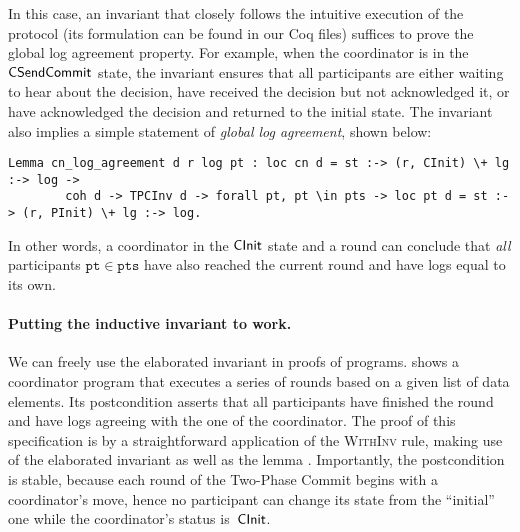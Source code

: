 
In this case, an invariant that closely follows the intuitive
execution of the protocol (its formulation can be found in our Coq
files) suffices to prove the global log agreement property.
%
For example, when the coordinator is in the $\mathsf{CSendCommit}$ state, the
invariant ensures that all participants are either waiting to hear
about the decision, have received the decision but not acknowledged
it, or have acknowledged the decision and returned to the initial state.
%
The invariant also implies a simple statement of \emph{global log agreement},
shown below:
%
\begin{lstlisting}[basicstyle=\footnotesize\ttfamily]
Lemma cn_log_agreement d r log pt : loc cn d = st :-> (r, CInit) \+ lg :-> log ->
        coh d -> TPCInv d -> forall pt, pt \in pts -> loc pt d = st :-> (r, PInit) \+ lg :-> log.
\end{lstlisting}
%
In other words, a coordinator  in the $\mathsf{CInit}$ state and a
round  can conclude that \emph{all} participants
{\small{$\mathtt{pt} \in \mathtt{pts}$}} have also reached the current
round  and have logs equal to its own.

\paragraph{Putting the inductive invariant to work.~}

We can freely use the elaborated invariant in proofs of programs.
%
 shows a coordinator program that executes
a series of rounds based on a given list  of data
elements.
%
Its postcondition asserts that all participants have finished the
round and have logs agreeing with the one of the coordinator.
%
The proof of this specification is by a straightforward application of
the \textsc{WithInv} rule, making use of the elaborated invariant
 as well as the lemma .
%
Importantly, the postcondition is stable, because each round of the
Two-Phase Commit begins with a coordinator's move, hence no
participant can change its state from the ``initial'' one while the
coordinator's status is~$\mathsf{CInit}$.

